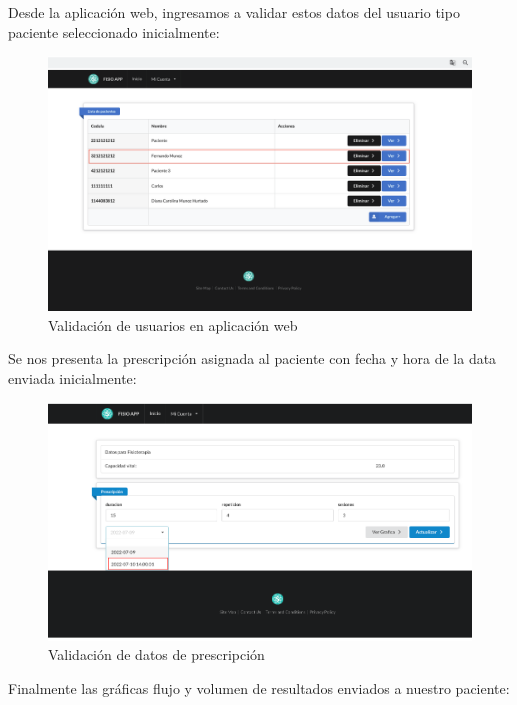 \documentclass[12pt]{article}
\begin{document}
Desde la aplicación web, ingresamos a validar estos datos del usuario tipo paciente seleccionado inicialmente:

\begin{figure}[ht]
\centering
\includegraphics[scale=0.3]{imag/TEST6UserF.png}
\caption{Validación de usuarios en aplicación web }
\label{6}
\end{figure}
\FloatBarrier

Se nos presenta la prescripción asignada al paciente con fecha y hora de la data enviada inicialmente:

\begin{figure}[ht]
\centering
\includegraphics[scale=0.3]{imag/TEST7Preescrip.png}
\caption{Validación de datos de prescripción }
\label{6}
\end{figure}
\FloatBarrier



Finalmente las gráficas flujo y volumen de resultados enviados a nuestro paciente:
\end{document}
